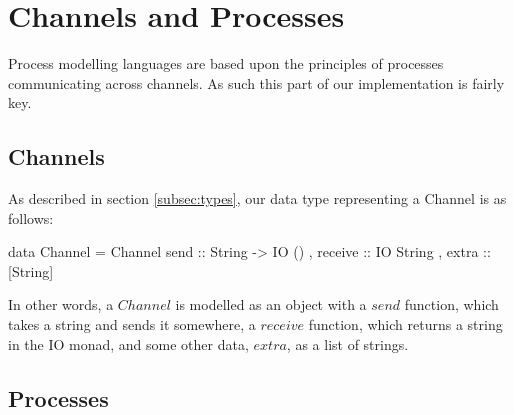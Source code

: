 \section{Channels and Processes}
\label{sec:channels}

Process modelling languages are based upon the principles of processes communicating across channels. As such this part of our implementation is fairly key. 

\subsection{Channels}

As described in section \ref{subsec:types}, our data type representing a Channel is as follows:
\begin{code}
data Channel = Channel {
               send         :: String -> IO ()
             , receive      :: IO String
             , extra        :: [String]
             }
\end{code}

In other words, a $Channel$ is modelled as an object with a $send$ function, which takes a string and sends it somewhere, a $receive$ function, which returns a string in the IO monad, and some other data, $extra$, as a list of strings.

\subsection{Processes}

